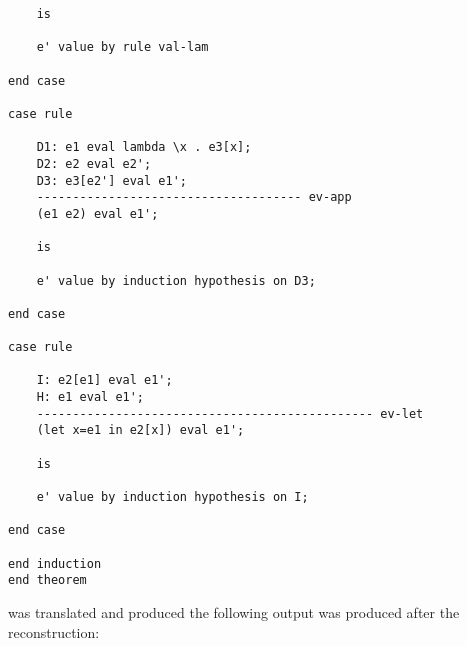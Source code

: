 \documentclass[12pt]{article}
\begin{document}
\begin{verbatim}
	is

	e' value by rule val-lam

end case

case rule

	D1: e1 eval lambda \x . e3[x];
	D2: e2 eval e2';
	D3: e3[e2'] eval e1';
	------------------------------------- ev-app
	(e1 e2) eval e1';

	is

	e' value by induction hypothesis on D3;

end case

case rule

	I: e2[e1] eval e1';
	H: e1 eval e1';
	----------------------------------------------- ev-let
	(let x=e1 in e2[x]) eval e1';

	is

	e' value by induction hypothesis on I;

end case

end induction
end theorem

\end{verbatim}
was translated and produced the following output was produced after the reconstruction:
\end{document}
